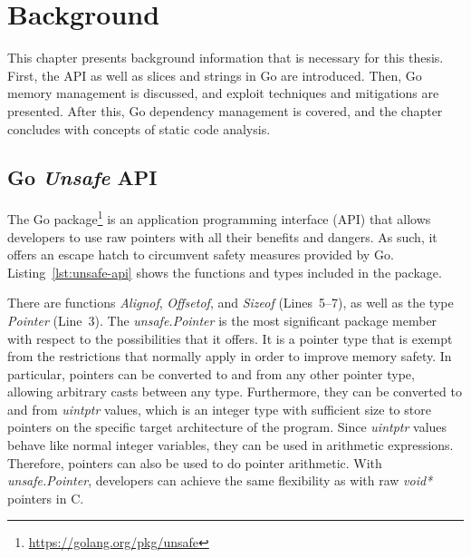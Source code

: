
\chapter{Background}\label{ch:background}

This chapter presents background information that is necessary for this thesis.
First, the \unsafe{} \acrshort{API} as well as slices and strings in Go are introduced.
Then, Go memory management is discussed, and exploit techniques and mitigations are presented.
After this, Go dependency management is covered, and the chapter concludes with concepts of static code analysis.



\section{Go \textit{Unsafe} API}\label{sec:background:unsafe-api}

The Go \unsafe{} package\footnote{\url{https://golang.org/pkg/unsafe}} is an application programming interface
(\acrshort{API}) that allows developers to use raw pointers with all their benefits and dangers.
As such, it offers an escape hatch to circumvent safety measures provided by Go.
Listing~\ref{lst:unsafe-api} shows the functions and types included in the \unsafe{} package.



There are  functions \textit{Alignof}, \textit{Offsetof}, and \textit{Sizeof} (Lines~5--7),
as well as the type \textit{Pointer} (Line~3).
The \textit{unsafe.Pointer} is the most significant package member with respect to the possibilities that it offers.
It is a pointer type that is exempt from the restrictions that normally apply in order to improve memory safety.
In particular, \unsafe{} pointers can be converted to and from any other pointer type, allowing arbitrary casts between
any type.
Furthermore, they can be converted to and from \textit{uintptr} values, which is an integer type with sufficient size
to store pointers on the specific target architecture of the program.
Since \textit{uintptr} values behave like normal integer variables, they can be used in arithmetic expressions.
Therefore, \unsafe{} pointers can also be used to do pointer arithmetic.
With \textit{unsafe.Pointer}, developers can achieve the same flexibility as with raw \textit{void*} pointers in C.

